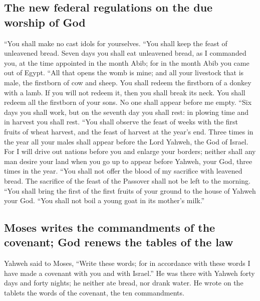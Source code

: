 \hypertarget{the-new-federal-regulations-on-the-due-worship-of-god}{%
\subsection{The new federal regulations on the due worship of
God}\label{the-new-federal-regulations-on-the-due-worship-of-god}}

 ``You shall make no cast idols for yourselves.
 ``You shall keep the feast of unleavened bread. Seven
days you shall eat unleavened bread, as I commanded you, at the time
appointed in the month Abib; for in the month Abib you came out of
Egypt.  ``All that opens the womb is mine; and all your
livestock that is male, the firstborn of cow and sheep. 
You shall redeem the firstborn of a donkey with a lamb. If you will not
redeem it, then you shall break its neck. You shall redeem all the
firstborn of your sons. No one shall appear before me empty.
 ``Six days you shall work, but on the seventh day you
shall rest: in plowing time and in harvest you shall rest.
 ``You shall observe the feast of weeks with the first
fruits of wheat harvest, and the feast of harvest at the year's end.
 Three times in the year all your males shall appear
before the Lord Yahweh, the God of Israel.  For I will
drive out nations before you and enlarge your borders; neither shall any
man desire your land when you go up to appear before Yahweh, your God,
three times in the year.  ``You shall not offer the blood
of my sacrifice with leavened bread. The sacrifice of the feast of the
Passover shall not be left to the morning.  ``You shall
bring the first of the first fruits of your ground to the house of
Yahweh your God. ``You shall not boil a young goat in its mother's
milk.''

\hypertarget{moses-writes-the-commandments-of-the-covenant-god-renews-the-tables-of-the-law}{%
\subsection{Moses writes the commandments of the covenant; God renews
the tables of the
law}\label{moses-writes-the-commandments-of-the-covenant-god-renews-the-tables-of-the-law}}

 Yahweh said to Moses, ``Write these words; for in
accordance with these words I have made a covenant with you and with
Israel.''  He was there with Yahweh forty days and forty
nights; he neither ate bread, nor drank water. He wrote on the tablets
the words of the covenant, the ten commandments.


